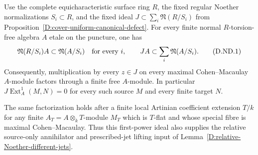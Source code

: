 \begin{proposition}
\label{D:cover-uniform-Noether-different}
Use the complete equicharacteristic surface ring $R$, the fixed regular
Noether normalizations $S_i\subset R$, and the fixed ideal
$J\subset\sum_i\mathfrak N(R/S_i)$ from
Proposition~\ref{D:cover-uniform-canonical-defect}. For every finite normal
$R$-torsion-free algebra $A$ etale on the puncture, one has
\[
 \mathfrak N(R/S_i)A\subset\mathfrak N(A/S_i)
 \quad\hbox{for every }i,\qquad
 JA\subset\sum_i\mathfrak N(A/S_i).                     \tag{D.ND.1}
\]
Consequently, multiplication by every $z\in J$ on every maximal
Cohen--Macaulay $A$-module factors through a finite free $A$-module.
In particular $J\operatorname{Ext}^1_A(M,N)=0$ for every such source $M$
and every finite target $N$.

The same factorization holds after a finite local Artinian coefficient
extension $T/k$ for any finite $A_T=A\otimes_kT$-module $M_T$ which is
$T$-flat and whose special fibre is maximal Cohen--Macaulay. Thus this
first-power ideal also supplies the relative source-only annihilator
and prescribed-jet lifting input of
Lemma~\ref{D:relative-Noether-different-jets}.
\end{proposition}
